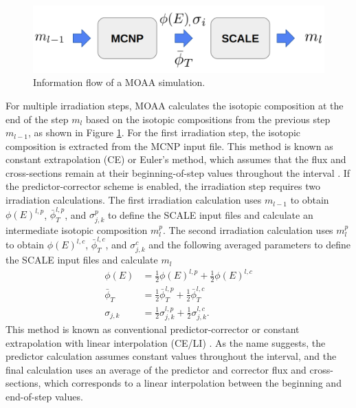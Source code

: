 \begin{figure}[htbp!]
  \begin{center}
    \includegraphics[scale=0.32]{figures/diagram_3}
  \end{center}
  \caption{Information flow of a MOAA simulation.}
  \label{fig:workflow_2}
\end{figure}

For multiple irradiation steps, MOAA calculates the isotopic composition at the end of the step $m_l$ based on the isotopic compositions from the previous step $m_{l-1}$, as shown in Figure \ref{fig:workflow_2}.
For the first irradiation step, the isotopic composition is extracted from the MCNP input file.
This method is known as constant extrapolation (CE) or Euler's method, which assumes that the flux and cross-sections remain at their beginning-of-step values throughout the interval \cite{leppanen_burnup_2012}.
If the predictor-corrector scheme is enabled, the irradiation step requires two irradiation calculations.
The first irradiation calculation uses $m_{l-1}$ to obtain $\phi(E)^{l, p}$, $\bar{\phi}_T^{l, p}$, and $\sigma_{j,k}^{p}$ to define the SCALE input files and calculate an intermediate isotopic composition $m_l^p$.
The second irradiation calculation uses $m_l^p$ to obtain $\phi(E)^{l, c}$, $\bar{\phi}_T^{l, c}$, and $\sigma_{j,k}^{c}$ and the following averaged parameters to define the SCALE input files and calculate $m_l$
\begin{align}
\phi(E) &= \frac{1}{2}\phi(E)^{l, p} + \frac{1}{2}\phi(E)^{l, c} \\
\bar{\phi}_T &= \frac{1}{2} \bar{\phi}_T^{l, p} + \frac{1}{2} \bar{\phi}_T^{l, c} \\
\sigma_{j,k} &= \frac{1}{2}\sigma_{j,k}^{l, p} + \frac{1}{2}\sigma_{j,k}^{l, c}.
\end{align}
This method is known as conventional predictor-corrector or constant extrapolation with linear interpolation (CE/LI) \cite{leppanen_burnup_2012}.
As the name suggests, the predictor calculation assumes constant values throughout the interval, and the final calculation uses an average of the predictor and corrector flux and cross-sections, which corresponds to a linear interpolation between the beginning and end-of-step values.

